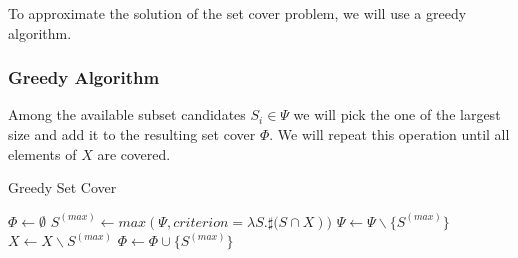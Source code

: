 \documentclass[10pt]{bmc_article}
\newenvironment{bmcformat}{\baselineskip20pt\sloppy\setboolean{publ}{false}}{\baselineskip20pt\sloppy}
\begin{document}
\begin{bmcformat}
To approximate the solution of the set cover problem, we will use a greedy algorithm.

\subsubsection*{Greedy Algorithm}
Among the available subset candidates $S_i \in \Psi$ we will pick the one of the largest size and add it to the resulting set cover $\Phi$. We will repeat this operation until all elements of $X$ are covered. \\

\begin{algorithm}[H]
\SetAlgoVlined
{}
\caption{Greedy Set Cover}
\BlankLine
$\Phi \leftarrow \emptyset$ 
\BlankLine
{} {
	$S^{(max)} \leftarrow max(\Psi, criterion=\lambda{S}.\sharp{(S\cap{X}}))$ 
	$\Psi \leftarrow \Psi\backslash\{S^{(max)}\}$ \;
	$X \leftarrow X\backslash{S^{(max)}}$ \;
	$\Phi \leftarrow \Phi\cup\{S^{(max)}\}$ \;
}
\BlankLine
\KwRet{$\Phi$}
\end{algorithm} 


\end{bmcformat}
\end{document}
